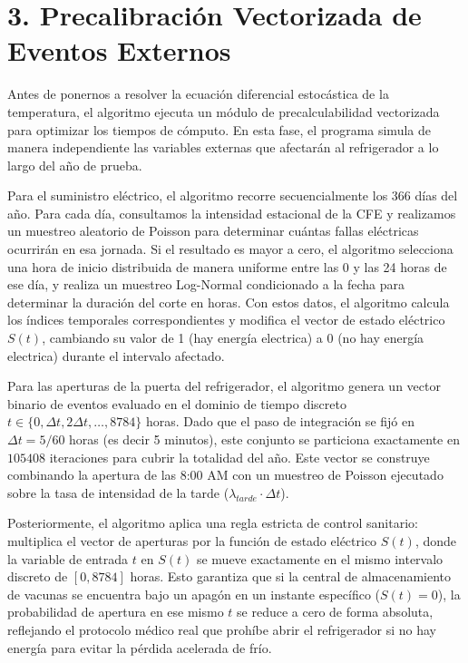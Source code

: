 \documentclass[
  spanish,
  letterpaper,
  DIV=11,
  numbers=noendperiod]{scrreprt}
\theoremstyle{plain}
\theoremstyle{definition}
\theoremstyle{remark}
\begin{document}
\section{3. Precalibración Vectorizada de Eventos
Externos}\label{precalibraciuxf3n-vectorizada-de-eventos-externos}

Antes de ponernos a resolver la ecuación diferencial estocástica de la
temperatura, el algoritmo ejecuta un módulo de precalculabilidad
vectorizada para optimizar los tiempos de cómputo. En esta fase, el
programa simula de manera independiente las variables externas que
afectarán al refrigerador a lo largo del año de prueba.

Para el suministro eléctrico, el algoritmo recorre secuencialmente los
366 días del año. Para cada día, consultamos la intensidad estacional de
la CFE y realizamos un muestreo aleatorio de Poisson para determinar
cuántas fallas eléctricas ocurrirán en esa jornada. Si el resultado es
mayor a cero, el algoritmo selecciona una hora de inicio distribuida de
manera uniforme entre las 0 y las 24 horas de ese día, y realiza un
muestreo Log-Normal condicionado a la fecha para determinar la duración
del corte en horas. Con estos datos, el algoritmo calcula los índices
temporales correspondientes y modifica el vector de estado eléctrico
\(S(t)\), cambiando su valor de 1 (hay energía electrica) a 0 (no hay
energía electrica) durante el intervalo afectado.

Para las aperturas de la puerta del refrigerador, el algoritmo genera un
vector binario de eventos evaluado en el dominio de tiempo discreto
\(t \in \{0, \Delta t, 2\Delta t, \dots, 8784\}\) horas. Dado que el
paso de integración se fijó en \(\Delta t = 5/60\) horas (es decir 5
minutos), este conjunto se particiona exactamente en \(105408\)
iteraciones para cubrir la totalidad del año. Este vector se construye
combinando la apertura de las 8:00 AM con un muestreo de Poisson
ejecutado sobre la tasa de intensidad de la tarde
(\(\lambda_{tarde} \cdot \Delta t\)).

Posteriormente, el algoritmo aplica una regla estricta de control
sanitario: multiplica el vector de aperturas por la función de estado
eléctrico \(S(t)\), donde la variable de entrada \(t\) en \(S(t)\) se
mueve exactamente en el mismo intervalo discreto de \([0, 8784]\) horas.
Esto garantiza que si la central de almacenamiento de vacunas se
encuentra bajo un apagón en un instante específico (\(S(t)=0\)), la
probabilidad de apertura en ese mismo \(t\) se reduce a cero de forma
absoluta, reflejando el protocolo médico real que prohíbe abrir el
refrigerador si no hay energía para evitar la pérdida acelerada de frío.
\end{document}
